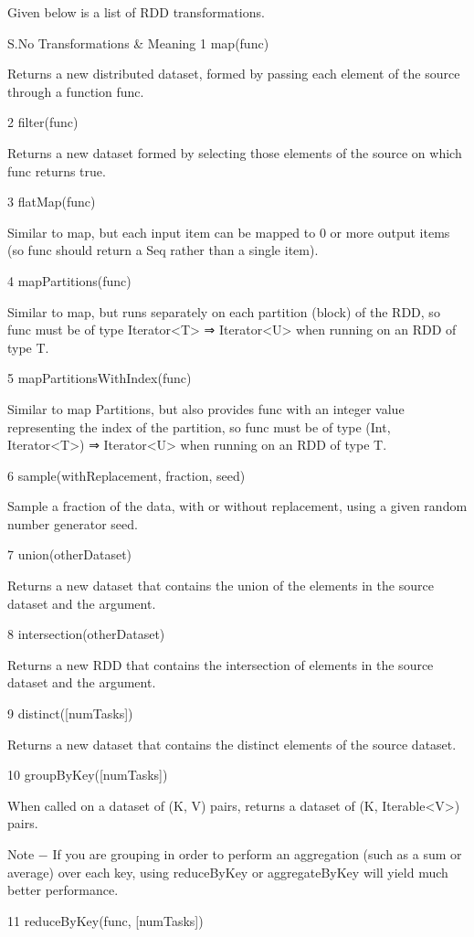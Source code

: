 Given below is a list of RDD transformations.

S.No	Transformations & Meaning
1	
map(func)

Returns a new distributed dataset, formed by passing each element of the source through a function func.

2	
filter(func)

Returns a new dataset formed by selecting those elements of the source on which func returns true.

3	
flatMap(func)

Similar to map, but each input item can be mapped to 0 or more output items (so func should return a Seq rather than a single item).

4	
mapPartitions(func)

Similar to map, but runs separately on each partition (block) of the RDD, so func must be of type Iterator<T> ⇒ Iterator<U> when running on an RDD of type T.

5	
mapPartitionsWithIndex(func)

Similar to map Partitions, but also provides func with an integer value representing the index of the partition, so func must be of type (Int, Iterator<T>) ⇒ Iterator<U> when running on an RDD of type T.

6	
sample(withReplacement, fraction, seed)

Sample a fraction of the data, with or without replacement, using a given random number generator seed.

7	
union(otherDataset)

Returns a new dataset that contains the union of the elements in the source dataset and the argument.

8	
intersection(otherDataset)

Returns a new RDD that contains the intersection of elements in the source dataset and the argument.

9	
distinct([numTasks])

Returns a new dataset that contains the distinct elements of the source dataset.

10	
groupByKey([numTasks])

When called on a dataset of (K, V) pairs, returns a dataset of (K, Iterable<V>) pairs.

Note − If you are grouping in order to perform an aggregation (such as a sum or average) over each key, using reduceByKey or aggregateByKey will yield much better performance.

11	
reduceByKey(func, [numTasks])

